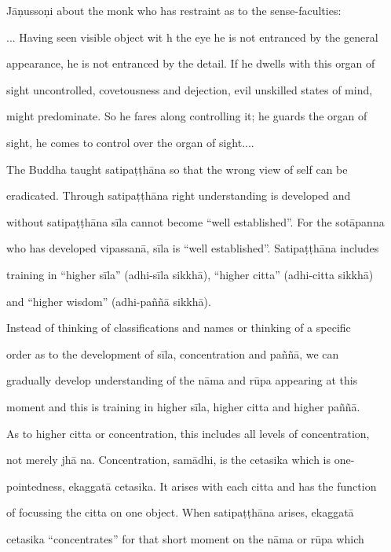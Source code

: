 Jāṇussoṇi about the monk who has restraint as to the sense-faculties: 



      ... Having seen visible object wit h the eye he is not entranced by the general  

      appearance, he is not entranced by the detail. If he dwells with this organ of  

      sight uncontrolled, covetousness and dejection, evil unskilled states of mind,  

      might predominate. So he fares along controlling it; he guards the organ of  

      sight, he comes to control over the organ of sight.... 



The   Buddha   taught   satipaṭṭhāna   so   that   the   wrong   view   of   self   can   be  

eradicated.   Through   satipaṭṭhāna   right   understanding   is   developed   and  

without satipaṭṭhāna sīla cannot become “well established”. For the sotāpanna  

who has developed vipassanā, sīla is “well established”.  Satipaṭṭhāna includes  

training  in  “higher  sīla”  (adhi-sīla  sikkhā),  “higher  citta”  (adhi-citta  sikkhā)  

and “higher wisdom”  (adhi-paññā sikkhā). 

   Instead  of  thinking  of  classifications  and  names  or  thinking  of  a  specific  

order   as   to   the   development   of   sīla,   concentration   and   paññā,   we   can  

gradually   develop   understanding   of  the   nāma   and   rūpa   appearing   at  this  

moment and this is training in higher sīla, higher citta and higher paññā. 

   As to higher citta or concentration, this includes all levels of concentration,  

not   merely   jhā na.   Concentration,   samādhi,   is   the   cetasika   which   is   one- 

pointedness,  ekaggatā cetasika. It  arises with each  citta  and has the function  

of   focussing   the   citta   on   one   object.   When   satipaṭṭhāna   arises,   ekaggatā  

cetasika  “concentrates”  for  that   short  moment  on  the  nāma  or  rūpa  which  

